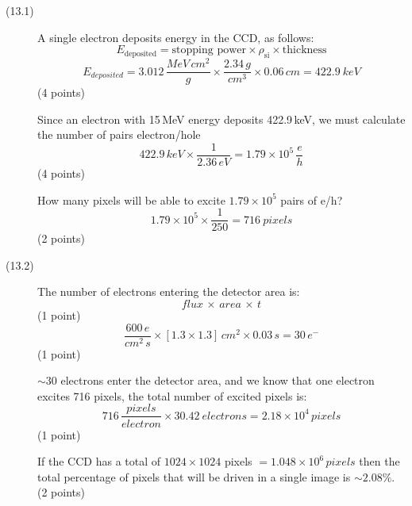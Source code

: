 \begin{description}
\item[(13.1)] A single electron deposits energy in the CCD, as follows:
\[ E_{\mathrm{deposited}}
   = \text{stopping power} \times \rho_{\mathrm{si}} \times \text{thickness} \]
\[ E_{deposited}
   = 3.012\,\frac{MeV\,cm^2}{g} \times \frac{2.34\,g}{cm^3}
     \times 0.06\,cm = 422.9~keV \]
\hfill(4 points)

Since an electron with 15\,MeV energy deposits 422.9\,keV, we must calculate
the number of pairs electron/hole
\[ 422.9\,keV \times \frac{1}{2.36\,eV}
   = 1.79 \times 10^{5}\,\frac{e}{h} \]
\hfill(4 points)

How many pixels will be able to excite $1.79 \times 10^{5}$ pairs of e/h?
\[ 1.79 \times 10^{5} \times \frac{1}{250} = 716~pixels \]
\hfill(2 points)

\item[(13.2)] The number of electrons entering the detector area is:
\[ flux \,\times\, area \,\times\, t \]
\hfill(1 point)
\[ \frac{600\,e}{cm^2\,s} \times [1.3 \times 1.3]\,cm^2 \times 0.03\,s
   = 30\,e^{-} \]
\hfill(1 point)

$\sim$30 electrons enter the detector area, and we know that one electron
excites 716 pixels, the total number of excited pixels is:
\[ 716\,\frac{pixels}{electron} \times 30.42~electrons
   = 2.18 \times 10^{4}\,pixels \]
\hfill(1 point)

If the CCD has a total of $1024 \times 1024$ pixels
$= 1.048 \times 10^{6}\,pixels$ then the total percentage of pixels that
will be driven in a single image is $\sim 2.08\%$. \hfill(2 points)
\end{description}

